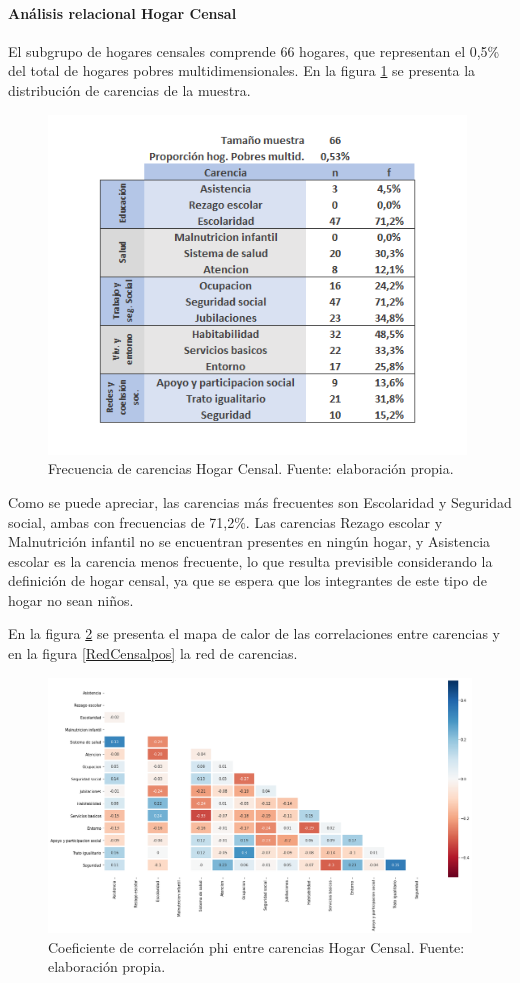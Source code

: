 \documentclass[12pt,letterpaper,spanish]{article}
\begin{document}
\paragraph{Análisis relacional Hogar Censal}
El subgrupo de hogares censales comprende 66 hogares, que representan el 0,5\% del total de hogares pobres multidimensionales. En la figura \ref{freCensal} se presenta la distribución de carencias de la muestra.
\begin{figure}[H]
  \centering
    \includegraphics[height=9cm]{HOGARES/tabla_censal.png}
    \caption{Frecuencia de carencias Hogar Censal. Fuente: elaboración propia.}
    \label{freCensal}
\end{figure}
Como se puede apreciar, las carencias más frecuentes son Escolaridad y Seguridad social, ambas con frecuencias de 71,2\%. Las carencias Rezago escolar y Malnutrición infantil no se encuentran presentes en ningún hogar, y Asistencia escolar es la carencia menos frecuente, lo que resulta previsible considerando la definición de hogar censal, ya que se espera que los integrantes de este tipo de hogar no sean niños. 

En la figura \ref{HMCensal} se presenta el mapa de calor de las correlaciones entre carencias y en la figura \ref{RedCensalpos} la red de carencias.

\begin{figure}[H]
    \centering
    \includegraphics[width=\textwidth]{Heatmaps/Heatmap_pearson_car_censal.png}
    \caption{Coeficiente de correlación phi entre carencias Hogar Censal. Fuente: elaboración propia.}
    \label{HMCensal}
\end{figure}
\end{document}
